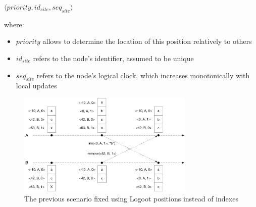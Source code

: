 \documentclass{article}
\newcommand{\tuple}[1]{\langle #1 \rangle}
\theoremstyle{definition}
\begin{document}
\begin{itemize}
    \begin{center}
        $\tuple{priority, id_{site}, seq_{site}}$
    \end{center}

    where:

    \begin{itemize}
        \item $priority$ allows to determine the location of this position relatively to others
        \item $id_{site}$ refers to the node's identifier, assumed to be unique
        \item $seq_{site}$ refers to the node's logical clock, which increases monotonically with local updates
    \end{itemize}

    \begin{figure}
        \centering
            \includegraphics[width=0.75\textwidth]{img/pos-based-seq.pdf}
        \caption{The previous scenario fixed using Logoot positions instead of indexes}
    \end{figure}


\end{itemize}
\end{document}
